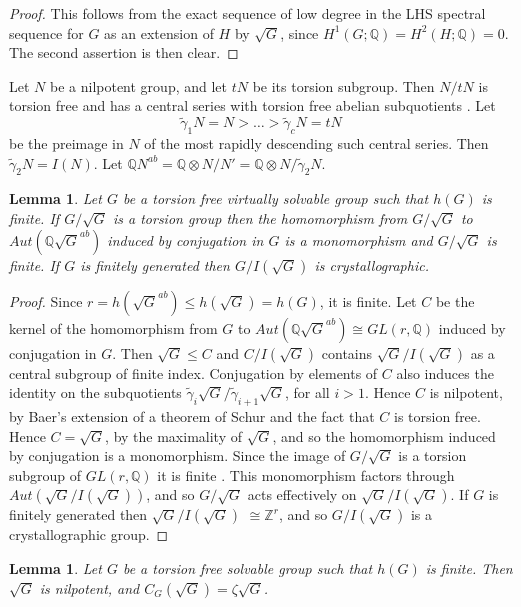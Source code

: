 \documentclass[12pt]{amsart}
\renewcommand{\leq}{\leqslant}
\newtheorem{lemma}[theorem]{Lemma}
\begin{document}
\begin{proof}
This follows from the exact sequence of low degree in the 
LHS spectral sequence for $G$ as an extension of $H$ by $\sqrt{G}$,
since $H^1(G;\mathbb{Q})=H^2(H;\mathbb{Q})=0$.
The second assertion is then clear.
\end{proof}

Let $N$ be a nilpotent group,
and let $tN$ be its torsion subgroup.
Then $N/tN$ is torsion free and has a  central series 
with torsion free abelian subquotients \cite[5.2.7 and 5.2.20]{Ro}.
Let 
\[
\tilde\gamma_1N=N>\dots>\tilde\gamma_cN=tN
\]
be the preimage in $N$ of the most rapidly descending such central series. 
Then $\tilde\gamma_2N=I(N)$.
Let $\mathbb{Q}N^{ab}=\mathbb{Q}\otimes{N/N'}=
\mathbb{Q}\otimes{N/\tilde\gamma_2N}$.

\begin{lemma}
\label{vnil}
Let $G$ be a torsion free virtually solvable group such that $h(G)$ is finite.
If $G/\sqrt{G}$ is a torsion group then the homomorphism from $G/\sqrt{G}$ 
to $Aut(\mathbb{Q}\sqrt{G}^{ab})$ induced by conjugation in $G$ 
is a monomorphism and  $G/\sqrt{G}$ is finite.
If $G$ is finitely generated then $G/I(\sqrt{G})$ is crystallographic.
\end{lemma}

\begin{proof}
Since $r=h(\sqrt{G}^{ab})\leq{h(\sqrt{G})}=h(G)$,  it is finite.
Let $C$ be the kernel of the homomorphism from $G$ to
$Aut(\mathbb{Q}\sqrt{G}^{ab})\cong{GL(r,\mathbb{Q})}$ induced by conjugation in $G$.
Then $\sqrt{G}\leq{C}$ and $C/I(\sqrt{G})$ contains 
$\sqrt{G}/I(\sqrt{G})$ as a central subgroup of finite index.
Conjugation by elements of $C$ also induces the identity on 
the subquotients $\tilde\gamma_i\sqrt{G}/\tilde\gamma_{i+1}\sqrt{G}$, for all $i>1$.
Hence $C$ is nilpotent, 
by Baer's extension of a theorem of Schur \cite[14.5.1]{Ro}
and the fact that $C$ is torsion free.
Hence $C=\sqrt{G}$, by the maximality of $\sqrt{G}$,
and so the homomorphism induced by conjugation is a monomorphism.
Since the image of $G/\sqrt{G}$ is a torsion subgroup of $GL(r,\mathbb{Q})$
 it is finite \cite[8.1.11]{Ro}.
This monomorphism factors through $Aut(\sqrt{G}/I(\sqrt{G}))$,
and so $G/\sqrt{G}$ acts effectively on $\sqrt{G}/I(\sqrt{G})$.
If $G$ is finitely generated then $\sqrt{G}/I(\sqrt{G})$ 
$\cong\mathbb{Z}^r$, 
and so $G/I(\sqrt{G})$ is a crystallographic group.
\end{proof}

\begin{lemma}
\label{HPnilp}
Let $G$ be a torsion free solvable group such that $h(G)$ is finite.
Then $\sqrt{G}$ is nilpotent, and $C_G(\sqrt{G})=\zeta\sqrt{G}$.
\end{lemma}
\end{document}
